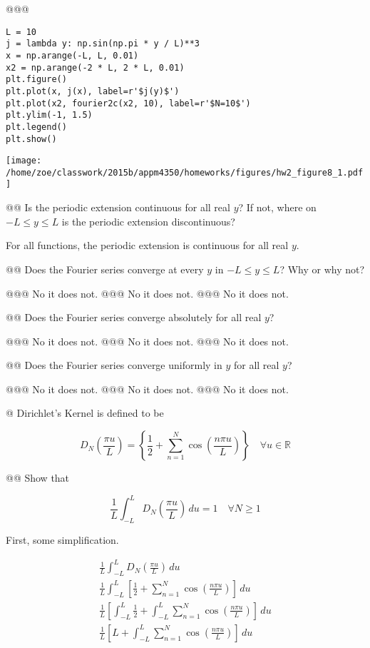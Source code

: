 \documentclass[10pt]{article}
\begin{document}
\begin{easylist}[enumerate]
    @@@
\weave

\begin{verbatim}
L = 10
j = lambda y: np.sin(np.pi * y / L)**3
x = np.arange(-L, L, 0.01)
x2 = np.arange(-2 * L, 2 * L, 0.01)
plt.figure()
plt.plot(x, j(x), label=r'$j(y)$')
plt.plot(x2, fourier2c(x2, 10), label=r'$N=10$')
plt.ylim(-1, 1.5)
plt.legend()
plt.show()
\end{verbatim}
\texttt{[image: /home/zoe/classwork/2015b/appm4350/homeworks/figures/hw2\_figure8\_1.pdf]}

\noweave

    @@ Is the periodic extension continuous for all real $y$? If not, where on $-L \le y \le L$ is the periodic
    extension discontinuous?

    For all functions, the periodic extension is continuous for all real $y$.

    @@ Does the Fourier series converge at every $y$ in $-L \le y \le L$? Why or why not?

    @@@ No it does not.
    @@@ No it does not.
    @@@ No it does not.

    @@ Does the Fourier series converge absolutely for all real $y$?

    @@@ No it does not.
    @@@ No it does not.
    @@@ No it does not.

    @@ Does the Fourier series converge uniformly in $y$ for all real $y$?

    @@@ No it does not.
    @@@ No it does not.
    @@@ No it does not.

    \newpage
    @ Dirichlet's Kernel is defined to be

    \[
        D_N \left( \frac{\pi u}{L} \right) = \left\{ \frac{1}{2} + \sum_{n=1}^N \cos \left( \frac{n \pi u}{L} \right) \right\} \quad \forall u \in \mathbb{R}
    \]

    @@ Show that

    \[
        \frac{1}{L} \int_{-L}^L D_N {\left( \frac{\pi u}{L} \right)} \, du = 1 \quad \forall N \ge 1
    \]

    First, some simplification.

    \begin{align*}
        \frac{1}{L} \int_{-L}^L D_N \left( \frac{\pi u}{L} \right) \, du\\
        \frac{1}{L} \int_{-L}^L \left[ \frac{1}{2} + \sum_{n=1}^N \cos\left( \frac{n\pi u}{L} \right)\right] \, du\\
        \frac{1}{L} \left[ \int_{-L}^L \frac{1}{2} + \int_{-L}^L \sum_{n=1}^N \cos\left( \frac{n\pi u}{L} \right)\right] \, du\\
        \frac{1}{L} \left[ L + \int_{-L}^L \sum_{n=1}^N \cos\left( \frac{n\pi u}{L} \right)\right] \, du\\
    \end{align*}


\end{easylist}
\end{document}
